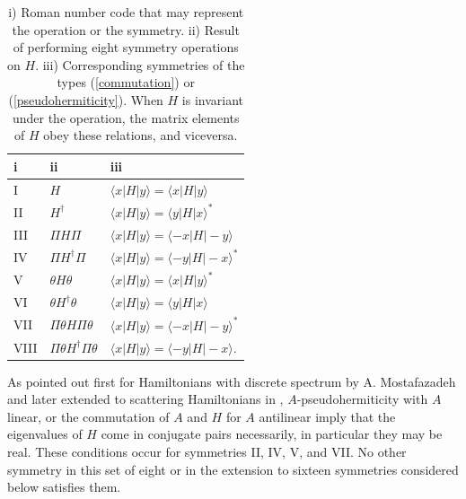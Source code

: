 %
%
%
\begin{table}[t]
\caption{
{i}) Roman number code that may represent the operation or the symmetry.
{ii}) Result of performing eight symmetry operations on $H$.
 {iii}) Corresponding symmetries of the types (\ref{commutation}) or (\ref{pseudohermiticity}).
When $H$ is invariant under the operation, the matrix elements of $H$ obey these relations, and viceversa.
 }
\label{table11}
\begin{tabular}{ lll }
  i&ii&iii\\
  \hline
   I     &     $H$                               &$\langle x|H|y \rangle=\langle x|H|y \rangle$                  \\
   II    &     $H^{\dagger}$                  & $\langle x|H|y \rangle=\langle y|H|x \rangle^{*}$         \\
   III   &     $\Pi H\Pi $                     & $\langle x|H|y \rangle=\langle -x|H|-y \rangle$               \\
   IV    &    $\Pi H^{\dagger}\Pi$         & $\langle x|H|y \rangle=\langle -y|H|-x \rangle^{*}$      \\
   V     &    $\theta H\theta$               & $\langle x|H|y \rangle=\langle x|H|y \rangle^{*}$         \\
   VI    &    $\theta H^{\dagger}\theta$        & $\langle x|H|y \rangle=\langle y|H|x \rangle$     \\
   VII   &    $\Pi\theta H\Pi\theta$    & $\langle x|H|y \rangle=\langle -x|H|-y \rangle^{*}$         \\
   VIII  &    $\Pi\theta H^{\dagger}\Pi\theta$ & $\langle x|H|y \rangle=\langle -y|H|-x \rangle$.\\


\end{tabular}

\end{table}
%
%

As pointed out first for Hamiltonians with discrete spectrum by A. Mostafazadeh \cite{Mostafazadeh2002,Mostafazadeh2002a,Mostafazadeh2002b} and later extended to scattering
Hamiltonians in \cite{Simon2019a}, \linebreak $A$-pseudohermiticity with $A$ linear, or the commutation of $A$ and $H$ for $A$ antilinear
imply that the eigenvalues of $H$ come in conjugate pairs necessarily, in particular they
may be real.
These conditions occur for symmetries II, IV, V, and VII.
No other symmetry in this set of eight or in the extension to sixteen symmetries
considered below satisfies them.





